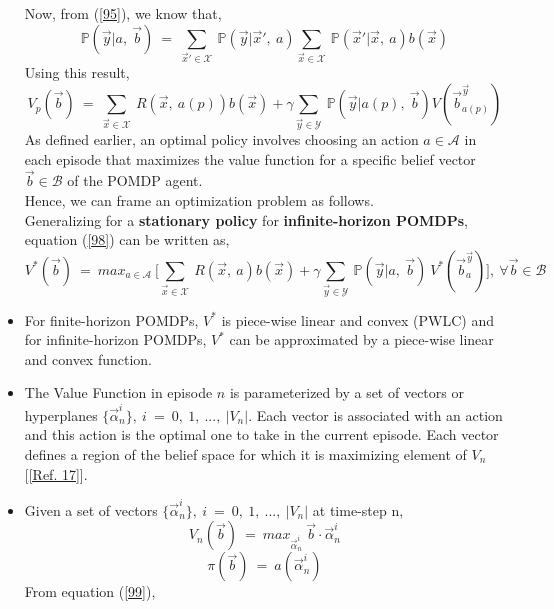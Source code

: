 \documentclass[12pt, draftcls, onecolumn]{IEEEtran}
\begin{document}
\begin{itemize}
    Now, from (\ref{95}), we know that,
    \begin{equation*}
        \mathbb{P}(\vec{y}|a,\ \vec{b})\ =\ \sum_{\vec{x}' \in \mathcal{X}}\ \mathbb{P}(\vec{y}|\vec{x}',\ a)\sum_{\vec{x} \in \mathcal{X}}\ \mathbb{P}(\vec{x}'|\vec{x},\ a)b(\vec{x})
    \end{equation*}
    Using this result,
    \begin{equation}\label{98}
        V_p(\vec{b})\ =\ \sum_{\vec{x} \in \mathcal{X}}\ R(\vec{x},\ a(p))b(\vec{x}) + \gamma \sum_{\vec{y} \in \mathcal{Y}}\ \mathbb{P}(\vec{y}|a(p),\ \vec{b})V(\vec{b}_{a(p)}^{\vec{y}})
    \end{equation}
    As defined earlier, an optimal policy involves choosing an action $a \in \mathcal{A}$ in each episode that maximizes the value function for a specific belief vector $\vec{b} \in \mathcal{B}$ of the POMDP agent.
    \\Hence, we can frame an optimization problem as follows.
    \\Generalizing for a \textbf{stationary policy} for \textbf{infinite-horizon POMDPs}, equation (\ref{98}) can be written as,
    \begin{equation}\label{99}
        V^*(\vec{b})\ =\ max_{a \in \mathcal{A}}\ \Big[\sum_{\vec{x} \in \mathcal{X}}\ R(\vec{x},\ a)b(\vec{x}) + \gamma \sum_{\vec{y} \in \mathcal{Y}}\ \mathbb{P}(\vec{y}|a,\ \vec{b})\ V^*(\vec{b}_a^{\vec{y}})\Big],\ \forall \vec{b} \in \mathcal{B}
    \end{equation}
    \item For finite-horizon POMDPs, $V^*$ is piece-wise linear and convex (PWLC) and for infinite-horizon POMDPs, $V^*$ can be approximated by a piece-wise linear and convex function.
    \item The Value Function in episode $n$ is parameterized by a set of vectors or hyperplanes $\{\vec{\alpha}^i_n\},\ i\ =\ 0,\ 1,\ ...,\ |V_n|$. Each vector is associated with an action and this action is the optimal one to take in the current episode. Each vector defines a region of the belief space for which it is maximizing element of $V_n$ [\ref{Ref. 17}].
    \item Given a set of vectors $\{\vec{\alpha}_n^i\},\ i\ =\ 0,\ 1,\ ...,\ |V_n|$ at time-step n,
    \begin{equation}\label{100}
        V_n(\vec{b})\ =\ max_{\vec{\alpha}^i_n}\ \vec{b} \cdot \vec{\alpha}^i_n
    \end{equation}
    \[\pi(\vec{b})\ =\ a(\vec{\alpha}^i_n)\]
    From equation (\ref{99}),

\end{itemize}
\end{document}
